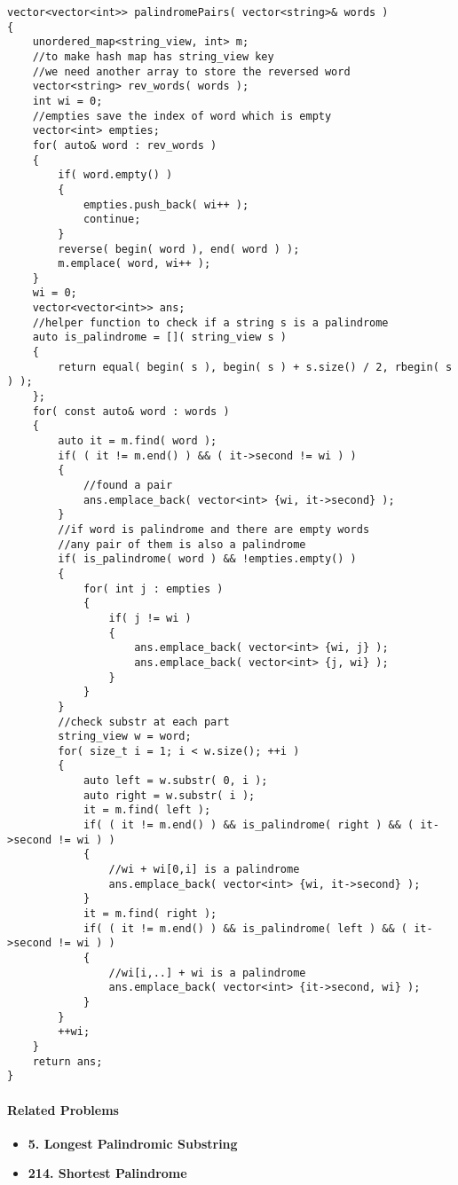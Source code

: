 \setcounter{lstlisting}{0}
\begin{lstlisting}[style=customc, caption={Hash Map}]
vector<vector<int>> palindromePairs( vector<string>& words )
{
    unordered_map<string_view, int> m;
    //to make hash map has string_view key
    //we need another array to store the reversed word
    vector<string> rev_words( words );
    int wi = 0;
    //empties save the index of word which is empty
    vector<int> empties;
    for( auto& word : rev_words )
    {
        if( word.empty() )
        {
            empties.push_back( wi++ );
            continue;
        }
        reverse( begin( word ), end( word ) );
        m.emplace( word, wi++ );
    }
    wi = 0;
    vector<vector<int>> ans;
    //helper function to check if a string s is a palindrome
    auto is_palindrome = []( string_view s )
    {
        return equal( begin( s ), begin( s ) + s.size() / 2, rbegin( s ) );
    };
    for( const auto& word : words )
    {
        auto it = m.find( word );
        if( ( it != m.end() ) && ( it->second != wi ) )
        {
            //found a pair
            ans.emplace_back( vector<int> {wi, it->second} );
        }
        //if word is palindrome and there are empty words
        //any pair of them is also a palindrome
        if( is_palindrome( word ) && !empties.empty() )
        {
            for( int j : empties )
            {
                if( j != wi )
                {
                    ans.emplace_back( vector<int> {wi, j} );
                    ans.emplace_back( vector<int> {j, wi} );
                }
            }
        }
        //check substr at each part
        string_view w = word;
        for( size_t i = 1; i < w.size(); ++i )
        {
            auto left = w.substr( 0, i );
            auto right = w.substr( i );
            it = m.find( left );
            if( ( it != m.end() ) && is_palindrome( right ) && ( it->second != wi ) )
            {
                //wi + wi[0,i] is a palindrome
                ans.emplace_back( vector<int> {wi, it->second} );
            }
            it = m.find( right );
            if( ( it != m.end() ) && is_palindrome( left ) && ( it->second != wi ) )
            {
                //wi[i,..] + wi is a palindrome
                ans.emplace_back( vector<int> {it->second, wi} );
            }
        }
        ++wi;
    }
    return ans;
}
\end{lstlisting}

\paragraph{Related Problems}
\begin{itemize}
\item \textbf{5. Longest Palindromic Substring}
\item \textbf{214. Shortest Palindrome}
\end{itemize}


